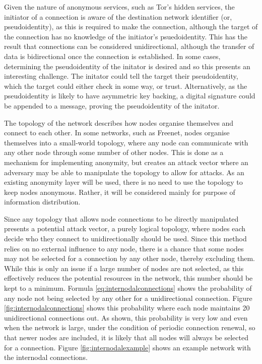 			Given the nature of anonymous services, such as Tor's hidden services, the initiator of a connection is aware of the destination network identifier (or, pseudoidentity), as this is required to make the connection, although the target of the connection has no knowledge of the initiator's psuedoidentity. This has the result that connections can be considered unidirectional, although the transfer of data is bidirectional once the connection is established. In some cases, determining the pseudoidentity of the initator is desired and so this presents an interesting challenge. The initator could tell the target their pseudoidentity, which the target could either check in some way, or trust. Alternatively, as the pseudoidentity is likely to have asymmetric key backing, a digital signature could be appended to a message, proving the pseudoidentity of the initator.
			
			
			
			The topology of the network describes how nodes organise themselves and connect to each other. In some networks, such as Freenet, nodes organise themselves into a small-world topology, where any node can communicate with any other node through some number of other nodes. This is done as a mechanism for implementing anonymity, but creates an attack vector where an adversary may be able to manipulate the topology to allow for attacks. As an existing anonymity layer will be used, there is no need to use the topology to keep nodes anonymous. Rather, it will be considered mainly for purpose of information distribution.
			
			Since any topology that allows node connections to be directly manipulated presents a potential attack vector, a purely logical topology, where nodes each decide who they connect to unidirectionally should be used. Since this method relies on no external influence to any node, there is a chance that some nodes may not be selected for a connection by any other node, thereby excluding them. While this is only an issue if a large number of nodes are not selected, as this effectively reduces the potential resources in the network, this number should be kept to a minimum. Formula \ref{eq:internodalconnections} shows the probability of any node not being selected by any other for a unidirectional connection. Figure \ref{fig:internodalconnections} shows this probability where each node maintains 20 unidirectional connections out. As shown, this probability is very low and even when the network is large, under the condition of periodic connection renewal, so that newer nodes are included, it is likely that all nodes will always be selected for a connection. Figure \ref{fig:internodalexample} shows an example network with the internodal connections.
			
